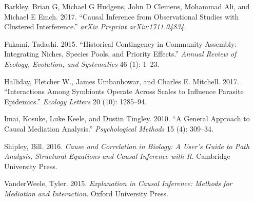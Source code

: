 \documentclass[]{article}
\begin{document}
\hypertarget{refs}{}
\leavevmode\hypertarget{ref-barkley2017causal}{}%
Barkley, Brian G, Michael G Hudgens, John D Clemens, Mohammad Ali, and
Michael E Emch. 2017. ``Causal Inference from Observational Studies with
Clustered Interference.'' \emph{arXiv Preprint arXiv:1711.04834}.

\leavevmode\hypertarget{ref-fukami2015historical}{}%
Fukami, Tadashi. 2015. ``Historical Contingency in Community Assembly:
Integrating Niches, Species Pools, and Priority Effects.'' \emph{Annual
Review of Ecology, Evolution, and Systematics} 46 (1): 1--23.

\leavevmode\hypertarget{ref-halliday2017interactions}{}%
Halliday, Fletcher W., James Umbanhowar, and Charles E. Mitchell. 2017.
``Interactions Among Symbionts Operate Across Scales to Influence
Parasite Epidemics.'' \emph{Ecology Letters} 20 (10): 1285--94.

\leavevmode\hypertarget{ref-imai2010general}{}%
Imai, Kosuke, Luke Keele, and Dustin Tingley. 2010. ``A General Approach
to Causal Mediation Analysis.'' \emph{Psychological Methods} 15 (4):
309--34.

\leavevmode\hypertarget{ref-shipley2016cause}{}%
Shipley, Bill. 2016. \emph{Cause and Correlation in Biology: A User's
Guide to Path Analysis, Structural Equations and Causal Inference with
R}. Cambridge University Press.

\leavevmode\hypertarget{ref-vanderweele2015explanation}{}%
VanderWeele, Tyler. 2015. \emph{Explanation in Causal Inference: Methods
for Mediation and Interaction}. Oxford University Press.
\end{document}
